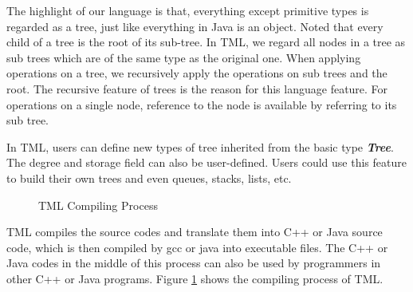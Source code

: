 \documentclass[aps,letterpaper,10pt]{revtex4}
\begin{document}
The highlight of our language is that, everything except primitive types is regarded as a tree, just like everything in Java is an object. Noted that every child of a tree is the root of its sub-tree. In TML, we regard all nodes in a tree as sub trees which are of the same type as the original one. When applying operations on a tree, we recursively apply the operations on sub trees and the root. The recursive feature of trees is the reason for this language feature. For operations on a single node, reference to the node is available by referring to its sub tree.

In TML, users can define new types of tree inherited from the basic type \textbf{\emph{Tree}}. The degree and storage field can also be user-defined. Users could use this feature to build their own trees and even queues, stacks, lists, etc.

\begin{figure}[ht]
{\centering {} \par}
\caption{TML Compiling Process}
\label{TCP}
\end{figure}

TML compiles the source codes and translate them into C++ or Java source code, which is then compiled by gcc or java into executable files. The C++ or Java codes in the middle of this process can also be used by programmers in other C++ or Java programs. Figure \ref{TCP} shows the compiling process of TML.
\end{document}
